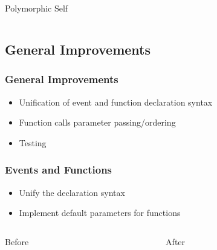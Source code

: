 \documentclass[aspectratio=169]{beamer}
\begin{document}
\begin{frame}{Polymorphic Self}
\inputminted{swift}{code/polymorphic-self.flint}
\end{frame}

\subsection{General Improvements}
\begin{frame}
\frametitle{General Improvements}
\begin{itemize}
    \item Unification of event and function declaration syntax
    \item Function calls parameter passing/ordering
    \item Testing
\end{itemize}
\end{frame}

\begin{frame}
\frametitle{Events and Functions}
\begin{itemize}
    \item Unify the declaration syntax
    \item Implement default parameters for functions
\end{itemize}
    \begin{columns}
        \begin{column}{0.5\textwidth}
            \begin{block}{Before}
	        \inputminted[fontsize=\small]{swift}{code/events-before.flint}
	        \end{block}
        \end{column}
        \begin{column}{0.5\textwidth}
            \begin{block}{After}
	        \inputminted[fontsize=\small]{swift}{code/events-after.flint}
	        \end{block}
        \end{column}
    \end{columns}
\end{frame}
\end{document}
